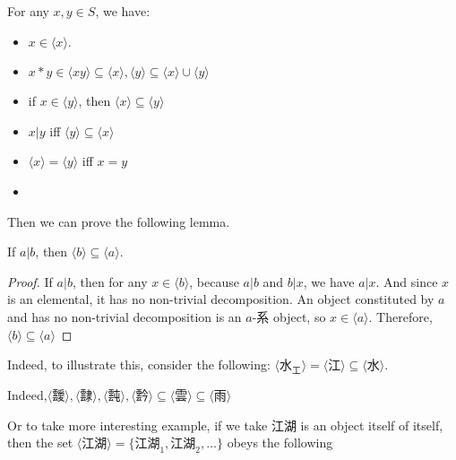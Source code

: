 \begin{theorem}\label{thm:properties-of-emergence-sets}
    For any $x,y\in S$, we have:
    \begin{itemize}
        \item $x \in \langle x \rangle$.
        \item $x*y \in \langle xy \rangle \subseteq \langle x \rangle , \langle y \rangle \subseteq \langle x \rangle \cup \langle y \rangle$
        \item if $x\in \langle y \rangle$, then $\langle x \rangle \subseteq \langle y \rangle$
        \item $x|y$ iff $\langle y \rangle \subseteq \langle x \rangle$
        \item $\langle x \rangle = \langle y \rangle$ iff $x =y$
        \item 
                
    \end{itemize}
\end{theorem}






Then we can prove the following lemma. 
\begin{lemma}\label{lem:emergence-of-a-constituted-is-emergence-of-the-constituent}
    If $a|b$, then $ \langle b \rangle \subseteq \langle a \rangle$.
\end{lemma}
\begin{proof}
    If $a|b$, then for any $x\in \langle b \rangle$, because $a|b$ and $b|x$, we have $a|x$. And since $x$ is an elemental, it has no non-trivial decomposition. An object constituted by $a$ and has no non-trivial decomposition is an $a$-系 object, so $x \in \langle a \rangle$. Therefore, $\langle b \rangle \subseteq \langle a \rangle$
\end{proof}

Indeed, to illustrate this, consider the following:
$\langle \text{水}_\text{工} \rangle = \langle \text{江} \rangle \subseteq
\langle \text{水} \rangle$. 

Indeed,$\langle \text{靉} \rangle, \langle \text{霴} \rangle, \langle \text{霕} \rangle, \langle \text{霒} \rangle \subseteq \langle \text{雲} \rangle \subseteq \langle \text{雨} \rangle$

Or to take more interesting example, if we take $\text{江湖}$ is an object itself of itself, then the set $\langle \text{江湖} \rangle = \{\text{江湖}_{1}, \text{江湖}_{2}, \ldots\}$ obeys the following 

